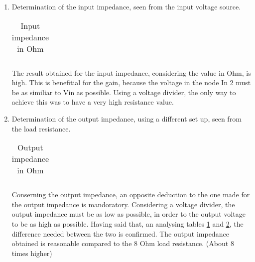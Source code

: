 \begin{enumerate}
\begin{figure}[ht]
\centering
\begin{subfigure}{.5\textwidth}
  \centering
  \texttt{[image: ../sim/vo1f.pdf]}
  \caption{Input Voltage}
  \label{fig:sim4}
\end{subfigure}%
\begin{subfigure}{.5\textwidth}
  \centering
  \texttt{[image: ../sim/vo2f.pdf]}
  \caption{Output voltage}
  \label{fig:sim5}
\end{subfigure}
\end{figure}




\item Determination of the input impedance, seen from the input voltage source.

\begin{table}[h]
  \centering
  \begin{tabular}{|l|r|}
    \hline    
   \end{tabular}
  \caption{Input impedance in Ohm}
    \label{tab:ZI}
\end{table}

\par The result obtained for the input impedance, considering the value in Ohm, is high. This is benefitial for the gain, because the voltage in the node In 2 must be as similiar to Vin as possible. Using a voltage divider, the only way to achieve this was to have a very high resistance value.

\item Determination of the output impedance, using a different set up, seen from the load resistance. 

\begin{table}[h]
  \centering
  \begin{tabular}{|l|r|}
    \hline    
   \end{tabular}
  \caption{Output impedance in Ohm}
  
  \label{tab:ZO}
\end{table}


Conserning the output impedance, an opposite deduction to the one made for the output impedance is mandoratory. Considering a voltage divider, the output impedance must be as low as possible, in order to the output voltage to be as high as possible. Having said that, an analysing tables \ref{tab:ZI} and \ref{tab:ZO}, the difference needed between the two is confirmed. The output impedance obtained is reasonable compared to the 8 Ohm load resistance. (About 8 times higher)


\end{enumerate}
